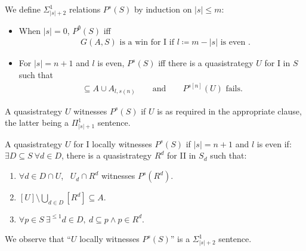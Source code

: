 \documentclass{beamer} %
\begin{document}
\begin{frame}
    \begin{definition}
        We define $\Sigma_{|s|+2}^1$ relations $P^s(S)$ by induction on $|s| \leq m$:
        \begin{itemize}
            \item<2-> When $|s|=0$, $P^{\emptyset}(S)$ iff \begin{align*}
                &G(A,S) \text{ is a win for I if } l \coloneq m-|s| \text{ is even }.
            \end{align*}
            \item<3-> For $|s|=n+1$ and $l$ is even, $P^{s}(S)$ iff there is a quasistrategy $U$ for I in $S$ such 
            that \begin{align*}
                [U] \subseteq A \cup A_{l, s(n)} \qquad \text{and} \qquad 
                P^{s[n]}(U) \text{ fails}.
            \end{align*}
        \end{itemize}
    \end{definition}
    \pause 
    \pause
    \pause
    A quasistrategy $U$ witnesses $P^{s}(S)$ if $U$ is as required in the appropriate clause, the latter being 
    a $\Pi_{|s|+1}^1$ sentence.
\end{frame}


\begin{frame}
    \begin{definition}
        A quasistrategy $U$ for I locally witnesses $P^s(S)$ if $|s| = n+1$ and 
        $l$ is even if:  
        $\exists D \subseteq S \ \forall d \in D$, there is a quasistrategy 
        $R^d$ for II in $S_d$ such that:
        \begin{enumerate}
            \item<2-> $\forall d \in D\cap U$, \ $U_d \cap R^d$ witnesses $P^s(R^d)$.
            \item<3-> $[U] \setminus \bigcup_{d \in D} [R^d] \subseteq A$.
            \item<4-> $\forall p \in S \ \exists^{\leq 1} d \in D, \ d \subseteq p \land p \in R^d$.
        \end{enumerate}
        \pause
        \pause
        \pause
        \pause
        We observe that ``$U$ locally witnesses $P^s(S)$'' is a $\Sigma_{|s|+2}^1$ sentence.
    \end{definition}
\end{frame}
\end{document}
